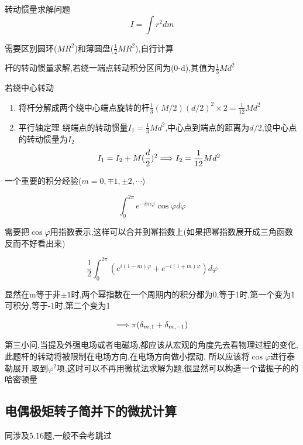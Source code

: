 \documentclass{article}
\begin{document}
            \begin{formal}
                转动惯量求解问题
                $$ I = \int r^{2} dm $$

                需要区别圆环($MR^{2}$)和薄圆盘($\frac{1}{2}MR^{2}$),自行计算

                杆的转动惯量求解,若绕一端点转动积分区间为(0-d),其值为$ \frac{1}{3}Md^{2} $

                若绕中心转动
                \begin{enumerate}
                    \item 将杆分解成两个绕中心端点旋转的杆$ \frac{1}{3}(M/2)(d/2)^{2} \times 2 = \frac{1}{12} Md^{2} $
                    \item 平行轴定理
                          绕端点的转动惯量$I_{1} = \frac{1}{3} M d^{2}$,中心点到端点的距离为$d/2$,设中心点的转动惯量为$I_{2}$
                          $$ I_{1} = I_{2} + M(\frac{d}{2})^{2} \Longrightarrow I_{2} = \frac{1}{12} M d^{2}$$
                \end{enumerate}
            \end{formal}

            \begin{formal}
                一个重要的积分经验($m = 0, \mp 1, \pm 2, \cdots $)

                $$ \int_{0}^{2\pi} e^{- i m \varphi} \cos{\varphi} d\varphi $$

                需要把$\cos{\varphi}$用指数表示,这样可以合并到幂指数上(如果把幂指数展开成三角函数反而不好看出来)
                
                $$ \dfrac{1}{2} \int_{0}^{2\pi} (e^{i(1-m)\varphi} + e^{-i(1+m)\varphi})  d\varphi$$

                显然在m等于非$\pm 1$时,两个幂指数在一个周期内的积分都为0,等于1时,第一个变为1可积分,等于-1时,第二个变为1

                $$ \Longrightarrow \pi (\delta_{m,1}+\delta_{m,-1}) $$
            \end{formal}

            第三小问,当提及外强电场或者电磁场,都应该从宏观的角度先去看物理过程的变化,此题杆的转动将被限制在电场方向,在电场方向做小摆动,
            所以应该将$\cos{\varphi}$进行泰勒展开,取到$\varphi^{2}$项,这时可以不再用微扰法求解为题,很显然可以构造一个谐振子的的哈密顿量
        
        \subsection{电偶极矩转子简并下的微扰计算}
            同涉及5.16题,一般不会考跳过
        
\end{document}
